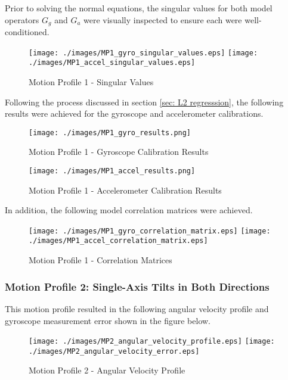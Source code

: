 Prior to solving the normal equations, the singular values for both model operators $G_g$ and $G_a$ were visually inspected to ensure each were well-conditioned. 

\begin{figure}[!h] 
	\centering
	\texttt{[image: ./images/MP1\_gyro\_singular\_values.eps]} \hfill
	\texttt{[image: ./images/MP1\_accel\_singular\_values.eps]}
	\caption{Motion Profile 1 - Singular Values}
	\label{fig: MP1 singular values}
\end{figure}
\FloatBarrier

Following the process discussed in section \ref{sec: L2 regresssion}, the following results were achieved for the gyroscope and accelerometer calibrations. 

\begin{figure}[h] 
	\centering
	\texttt{[image: ./images/MP1\_gyro\_results.png]}
	\caption{Motion Profile 1 - Gyroscope Calibration Results}
	\label{fig: MP1 gyro results}
\end{figure}
\FloatBarrier

\begin{figure}[h] 
	\centering
	\texttt{[image: ./images/MP1\_accel\_results.png]}
	\caption{Motion Profile 1 - Accelerometer Calibration Results}
	\label{fig: MP1 accel results}
\end{figure}
\FloatBarrier

In addition, the following model correlation matrices were achieved.

\begin{figure}[!h] 
	\centering
	\texttt{[image: ./images/MP1\_gyro\_correlation\_matrix.eps]} \hfill
	\texttt{[image: ./images/MP1\_accel\_correlation\_matrix.eps]}
	\caption{Motion Profile 1 - Correlation Matrices}
	\label{fig: MP1 correlation matrix}
\end{figure}
\FloatBarrier

\subsubsection{Motion Profile 2: Single-Axis Tilts in Both Directions}

This motion profile resulted in the following angular velocity profile and gyroscope measurement error shown in the figure below. 

\begin{figure}[!h] 
	\centering
	\texttt{[image: ./images/MP2\_angular\_velocity\_profile.eps]} \hfill
	\texttt{[image: ./images/MP2\_angular\_velocity\_error.eps]}
	\caption{Motion Profile 2 - Angular Velocity Profile}
	\label{fig: MP2 angular velocity profile}
\end{figure}
\FloatBarrier

